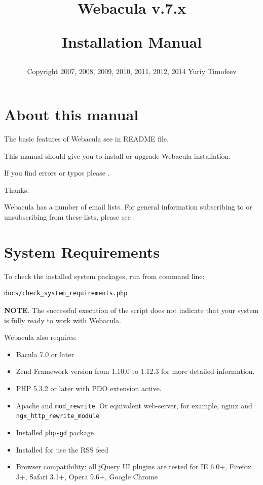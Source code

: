 \documentclass[10pt]{article}
\title{
  \Huge{Webacula v.7.x}
  \begin{center}
   \large{Installation Manual}
  \end{center}
}
\author{
  \begin{small}
    Copyright 2007, 2008, 2009, 2010, 2011, 2012, 2014
    Yuriy Timofeev \htmladdnormallink{tim4dev@gmail.com}{mailto:tim4dev@gmail.com}
  \end{small}
}
\begin{document}
\maketitle
\clearpage

\tableofcontents
\clearpage

\listoffigures
\clearpage

\section{About this manual}
\label{About}

The basic features of Webacula see in README file.

This manual should give you to install or upgrade Webacula installation.

If you find errors or typos please
.

Thanks.

Webacula has a number of email lists.
For general information subscribing to or unsubscribing from these lists, please see 
.



\section{System Requirements}
\label{System Requirements}

To check the installed system packages, run from command line:
\begin{verbatim}docs/check_system_requirements.php\end{verbatim}

\textbf{NOTE}. The successful execution of the script does not indicate that your system is fully ready to work with Webacula.


Webacula also requires:
\begin{itemize}
  \item Bacula 7.0 or later
  \item Zend Framework version from 1.10.0 to 1.12.3
        for more detailed information.
  \item PHP 5.3.2 or later with PDO extension active.
  \item Apache and \texttt{mod\_rewrite}. Or equivalent web-server, for example, nginx and \texttt{ngx\_http\_rewrite\_module}
  \item Installed \texttt{php-gd} package
  \item Installed  for use the RSS feed
  \item Browser compatibility: all jQuery UI plugins are tested for IE 6.0+, Firefox 3+, Safari 3.1+, Opera 9.6+, Google Chrome
\end{itemize}
\end{document}
